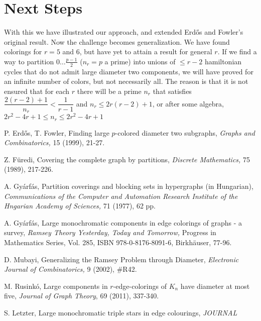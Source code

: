 \documentclass{article}
\begin{document}
	\section*{Next Steps}

	With this we have illustrated our approach, and extended Erd\H os and Fowler's original result. Now the challenge becomes generalization. We have found colorings for $ r=5 $ and $ 6 $, but have yet to attain a result for general $ r $. If we find a way to partition $ 0\ldots \frac{p-1}{2} $ ($ n_r=p $ a prime) into unions of $ \le r-2 $ hamiltonian cycles that do not admit large diameter two components, we will have proved for an infinite number of colors, but not necessarily all. The reason is that it is not ensured that for each $ r $ there will be a prime $ n_r $ that satisfies $ \dfrac{2(r-2)+1}{n_r}< \dfrac{1}{r-1} $ and $ n_r\le 2r(r-2)+1 $, or after some algebra, $ 2r^2-4r+1\le n_r \le 2r^2-4r+1 $
	
	\begin{thebibliography}{99}
		 P. Erd\H os, T. Fowler, Finding large $p$-colored diameter two subgraphs,
		{\em Graphs and Combinatorics,} 15 (1999), 21-27.
		
		 Z. F\"uredi, Covering the complete graph by partitions, {\em Discrete Mathematics,}
		75 (1989), 217-226.
		
		 A. Gy\'arf\'as, Partition coverings and blocking sets in hypergraphs
		(in Hungarian),
		{\em Communications of the Computer and Automation Research Institute of
			the Hngarian Academy of Sciences,} 71 (1977), 62 pp.
		
		 A. Gy\'arf\'as, Large monochromatic components in edge colorings of graphs -
		a survey, {\em Ramsey Theory Yesterday, Today and Tomorrow,} Progress in Mathematics Series,
		Vol. 285, ISBN 978-0-8176-8091-6, Birkh\"auser, 77-96.
		
		 D. Mubayi, Generalizing the Ramsey Problem through Diameter,
		{\em Electronic Journal of Combinatorics,} 9 (2002), $\#$R42.
		
		 M. Rusink\'o, Large components in $ r $-edge-colorings of $ K_n $ have diameter at most five, {\em Journal of Graph Theory}, 69 (2011), 337-340.
		
		 S. Letzter, Large monochromatic triple stars in edge colourings, {\em JOURNAL}
	\end{thebibliography}
	
\end{document}

